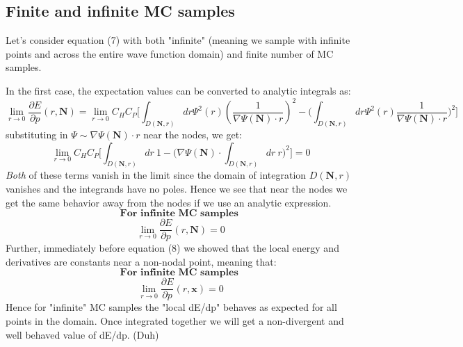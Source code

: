 \documentclass{article}
\begin{document}
\subsection{Finite and infinite MC samples}
Let's consider equation (7) with both "infinite" (meaning we sample with infinite points and across the entire wave function domain) and finite number of MC samples.

In the first case, the expectation values can be converted to analytic integrals as:
$$\lim_{r \rightarrow 0} \frac{\partial E}{\partial p}(r,\textbf{N}) = \lim_{r \rightarrow 0} C_HC_P \Bigg[\int_{D(\textbf{N},r)} dr \Psi^2(r) (\frac{1}{\nabla \Psi(\textbf{N})\cdot r})^2 -  \Big(\int_{D(\textbf{N},r)} dr \Psi^2(r) \frac{1}{\nabla \Psi(\textbf{N})\cdot r}\Big)^2 \Bigg]$$
substituting in $\Psi \sim \nabla \Psi(\textbf{N})\cdot r$ near the nodes, we get:
$$\lim_{r \rightarrow 0} C_HC_P \Bigg[\int_{D(\textbf{N},r)}dr\ 1  -  \Big(\nabla \Psi(\textbf{N}) \cdot \int_{D(\textbf{N},r)}  dr\ r \Big)^2 \Bigg]= 0 $$
\textit{Both} of these terms vanish in the limit since the domain of integration $D(\textbf{N},r)$ vanishes and the integrands have no poles.
Hence we see that near the nodes we get the same behavior away from the nodes if we use an analytic expression.
$$\textbf{For\ } \textbf{infinite\ } \textbf{MC } \textbf{samples }$$
\begin{equation}
\boxed{\lim_{r \rightarrow 0} \frac{\partial E}{\partial p}(r,\textbf{N}) = 0}
\end{equation}
Further, immediately before equation (8) we showed that the local energy and derivatives are constants near a non-nodal point, meaning that:
$$\textbf{For\ } \textbf{infinite\ } \textbf{MC } \textbf{samples }$$
\begin{equation}
\boxed{\lim_{r \rightarrow 0} \frac{\partial E}{\partial p}(r,\textbf{x}) = 0}
\end{equation}
Hence for "infinite" MC samples the "local dE/dp" behaves as expected for all points in the domain. Once integrated together we will get a non-divergent and well behaved value of dE/dp. (Duh)
\end{document}
